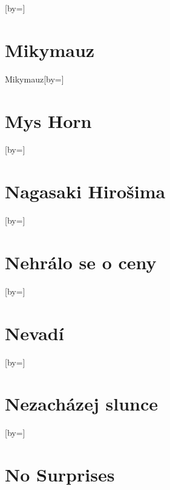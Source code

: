 \documentclass{article}
\begin{document}
\begin{songs}{}
\begin{song}{}[by={}]
\endverse
\end{song}

\section{Mikymauz}
\begin{song}{Mikymauz}[by={}]
\beginverse

\endverse
\end{song}

\section{Mys Horn}
\begin{song}{}[by={}]
\beginverse

\endverse
\end{song}

\section{Nagasaki Hirošima}
\begin{song}{}[by={}]
\beginverse

\endverse
\end{song}

\section{Nehrálo se o ceny}
\begin{song}{}[by={}]
\beginverse

\endverse
\end{song}

\section{Nevadí}
\begin{song}{}[by={}]
\beginverse

\endverse
\end{song}

\section{Nezacházej slunce}
\begin{song}{}[by={}]
\beginverse

\endverse
\end{song}

\section{No Surprises}


\end{songs}
\end{document}

